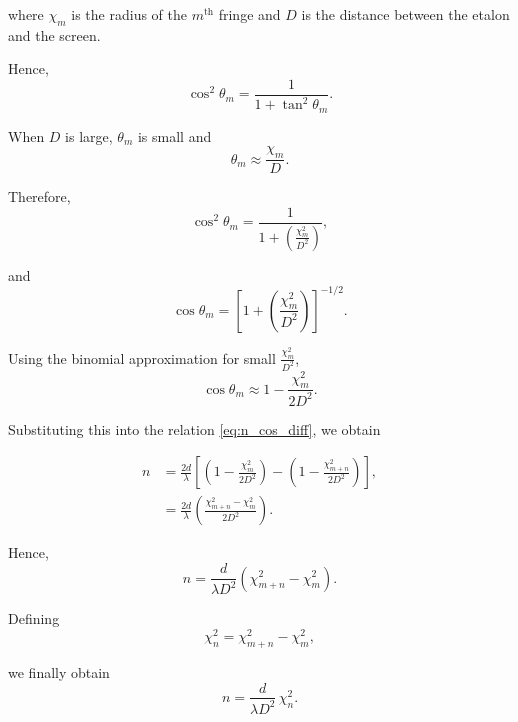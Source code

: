 where $\chi_m$ is the radius of the $m^{\text{th}}$ fringe and $D$ is the distance between the etalon and the screen.

Hence,
\begin{equation}
\cos^2\theta_m = \frac{1}{1+\tan^2\theta_m}.
\end{equation}

When $D$ is large, $\theta_m$ is small and
\begin{equation}
\theta_m \approx \frac{\chi_m}{D}.
\end{equation}

Therefore,
\begin{equation}
\cos^2\theta_m = \frac{1}{1+\left(\frac{\chi_m^2}{D^2}\right)},
\end{equation}

and
\begin{equation}
\cos\theta_m = \left[ 1+\left(\frac{\chi_m^2}{D^2}\right) \right]^{-1/2}.
\end{equation}

Using the binomial approximation for small $\frac{\chi_m^2}{D^2}$,
\begin{equation}
\cos\theta_m \approx 1 - \frac{\chi_m^2}{2D^2}.
\end{equation}

Substituting this into the relation \cref{eq:n_cos_diff}, we obtain

\begin{align}
n &= \frac{2d}{\lambda}
\left[
\left(1 - \frac{\chi_m^2}{2D^2}\right)
-
\left(1 - \frac{\chi_{m+n}^2}{2D^2}\right)
\right], \\
&= \frac{2d}{\lambda}\left( \frac{\chi_{m+n}^2 - \chi_m^2}{2D^2} \right).
\end{align}

Hence,
\begin{equation}
\boxed{n = \frac{d}{\lambda D^2}
\left( \chi_{m+n}^2 - \chi_m^2 \right)}.
\end{equation}

Defining
\begin{equation}
\chi_n^2 = \chi_{m+n}^2 - \chi_m^2,
\end{equation}

we finally obtain
\begin{equation}
\label{eq:final_eq}
\boxed{n = \frac{d}{\lambda D^2}\, \chi_n^2}.
\end{equation}

